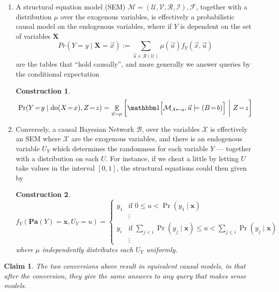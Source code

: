 \documentclass{article}
\newcommand{\E}{\mathop{\mathbb E}}
\newcommand\Pa{\mathbf{Pa}}
\theoremstyle{plain}
\newtheorem{claim}[theorem]{Claim}
\newtheorem{constr}{Construction}
\theoremstyle{definition}
\theoremstyle{remark}
\newcommand{\cdo}{\mathop{\mathrm{do}}}
\begin{document}
\begin{enumerate}
\item A structural equation model (SEM) $\mathcal M = (\mathcal U, \mathcal V, \mathcal R, \mathcal I), \mathcal F$, together with a distribution $\mu$ over the exogenous variables, is effectively a probabilistic causal model on the endogenous variables, where if $Y$ is dependent on the set of variables $\mathbf X$
\[ Pr(Y = y \mid \mathbf X = \vec x) := \sum_{\vec u \in \mathcal R(\mathcal U)} \mu(\vec u) f_Y(\vec x, \vec u) \]
are the tables that ``hold causally'', and more generally we answer queries by the conditional expectation
\begin{constr}
	\[ \Pr(Y\!=\!y \mid \cdo(X\!=\!x), Z\!=\!z) = \E_{\vec u \sim \mu}\bigg[ \mathbbm1\Big[ \mathcal M_{A \gets a}, \vec u\models (B\!=\!b) \Big]~\bigg|~Z\!=\!z\bigg] \]
\end{constr}

\item Conversely, a causal Bayesian Network $\mathcal B$, over the variables $\mathcal X$ is effectively an SEM where $\mathcal X$ are the exogenous variables, and there is an endogenous variable $U_Y$ which determines the randomness for each variable $Y$ --- together with a distribution on each $U$. For instance, if we cheat a little by letting $U$ take values in the interval $[0,1]$, the structural equations could then given by 
\begin{constr}
\[ f_Y(\Pa(Y) = \mathbf x, U_Y = u) = \begin{cases}
	y_1 & \text{if }0 \leq u < \Pr(y_1\mid \mathbf x) \\
	&\vdots \\
	y_i & \text{if }\sum_{j < i} \Pr(y_j\mid \mathbf x) \leq u < \sum_{j \leq i} \Pr (y_j\mid \mathbf x)\\
	&\vdots
\end{cases} 
\]
where $\mu$ independently distributes each $U_Y$ uniformly.
\end{constr}
\end{enumerate}

\begin{claim}
	The two conversions above result in equivalent causal models, in that after the conversion, they give the same answers to any query that makes sense models.
\end{claim}
\end{document}
